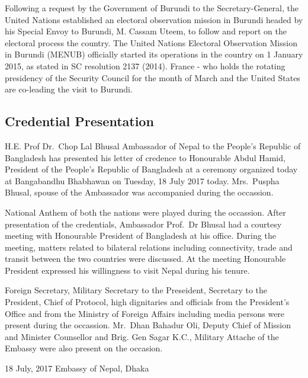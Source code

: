 \documentclass[
  openany]{book}
\begin{document}
Following a request by the Government of Burundi to the Secretary-General, the United Nations established an electoral observation mission in Burundi headed by his Special Envoy to Burundi, M. Cassam Uteem, to follow and report on the electoral process the country. The United Nations Electoral Observation Mission in Burundi (MENUB) officially started its operations in the country on 1 January 2015, as stated in SC resolution 2137 (2014). France - who holds the rotating presidency of the Security Council for the month of March and the United States are co-leading the visit to Burundi.

\hypertarget{credential-presentation}{%
\subsection{Credential Presentation}\label{credential-presentation}}

H.E. Prof Dr.~Chop Lal Bhusal Ambassador of Nepal to the People's Republic of Bangladesh has presented his letter of credence to Honourable Abdul Hamid, President of the People's Republic of Bangladesh at a ceremony organized today at Bangabandhu Bhabhawan on Tuesday, 18 July 2017 today. Mrs.~Puspha Bhusal, spouse of the Ambassador was accompanied during the occassion.

National Anthem of both the nations were played during the occassion. After presentation of the credentials, Ambassador Prof.~Dr Bhusal had a courtesy meeting with Honourable President of Bangladesh at his office. During the meeting, matters related to bilateral relations including connectivity, trade and transit between the two countries were discussed. At the meeting Honourable President expressed his willingness to visit Nepal during his tenure.

Foreign Secretary, Military Secretary to the Preseident, Secretary to the President, Chief of Protocol, high dignitaries and officials from the President's Office and from the Ministry of Foreign Affairs including media persons were present during the occassion. Mr.~Dhan Bahadur Oli, Deputy Chief of Mission and Minister Counsellor and Brig. Gen Sagar K.C., Military Attache of the Embassy were also present on the occasion.

18 July, 2017
Embassy of Nepal, Dhaka

  
\end{document}
